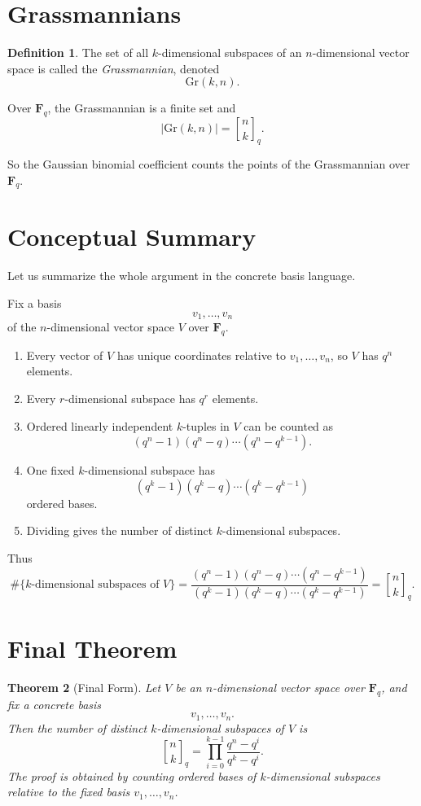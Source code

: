 \documentclass[11pt]{article}
\newtheorem{theorem}{Theorem}[section]
\theoremstyle{definition}
\newtheorem{definition}[theorem]{Definition}
\theoremstyle{remark}
\newcommand{\F}{\mathbf{F}}
\newcommand{\Gr}{\mathrm{Gr}}
\newcommand{\qbinom}[2]{\genfrac{[}{]}{0pt}{}{#1}{#2}_q}
\begin{document}
	\section{Grassmannians}
	
	\begin{definition}
		The set of all \(k\)-dimensional subspaces of an \(n\)-dimensional vector space is called the \emph{Grassmannian}, denoted
		\[
		\Gr(k,n).
		\]
	\end{definition}
	
	Over \(\F_q\), the Grassmannian is a finite set and
	\[
	|\Gr(k,n)|=\qbinom{n}{k}.
	\]
	
	So the Gaussian binomial coefficient counts the points of the Grassmannian over \(\F_q\).
	
	\section{Conceptual Summary}
	
	Let us summarize the whole argument in the concrete basis language.
	
	Fix a basis
	\[
	v_1,\dots,v_n
	\]
	of the \(n\)-dimensional vector space \(V\) over \(\F_q\).
	
	\begin{enumerate}[label=\arabic*.]
		\item Every vector of \(V\) has unique coordinates relative to \(v_1,\dots,v_n\), so \(V\) has \(q^n\) elements.
		\item Every \(r\)-dimensional subspace has \(q^r\) elements.
		\item Ordered linearly independent \(k\)-tuples in \(V\) can be counted as
		\[
		(q^n-1)(q^n-q)\cdots(q^n-q^{k-1}).
		\]
		\item One fixed \(k\)-dimensional subspace has
		\[
		(q^k-1)(q^k-q)\cdots(q^k-q^{k-1})
		\]
		ordered bases.
		\item Dividing gives the number of distinct \(k\)-dimensional subspaces.
	\end{enumerate}
	
	Thus
	\[
	\boxed{
		\#\{\text{\(k\)-dimensional subspaces of }V\}
		=
		\frac{(q^n-1)(q^n-q)\cdots(q^n-q^{k-1})}
		{(q^k-1)(q^k-q)\cdots(q^k-q^{k-1})}
		=
		\qbinom{n}{k}.
	}
	\]
	
	\section{Final Theorem}
	
	\begin{theorem}[Final Form]
		Let \(V\) be an \(n\)-dimensional vector space over \(\F_q\), and fix a concrete basis
		\[
		v_1,\dots,v_n.
		\]
		Then the number of distinct \(k\)-dimensional subspaces of \(V\) is
		\[
		\boxed{
			\qbinom{n}{k}
			=
			\prod_{i=0}^{k-1}\frac{q^n-q^i}{q^k-q^i}
		}.
		\]
		The proof is obtained by counting ordered bases of \(k\)-dimensional subspaces relative to the fixed basis \(v_1,\dots,v_n\).
	\end{theorem}
	
\end{document}
